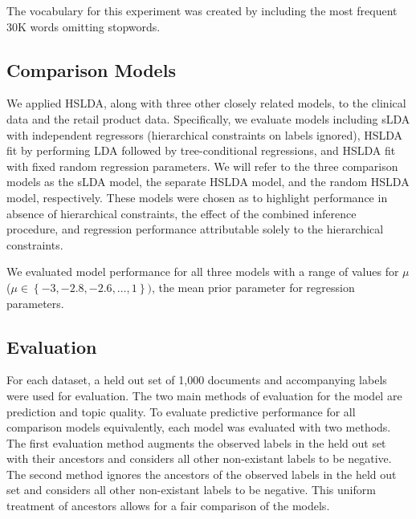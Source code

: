\documentclass{article}
\begin{document}
The vocabulary for this experiment was created by including the most
frequent 30K words omitting stopwords.


\subsection{Comparison Models}

We applied HSLDA, along with three other closely related models, to
the clinical data and the retail product data. Specifically, we evaluate
models including sLDA with independent regressors (hierarchical constraints
on labels ignored), HSLDA fit by performing LDA followed by tree-conditional
regressions, and HSLDA fit with fixed random regression parameters.
We will refer to the three comparison models as the sLDA model, the
separate HSLDA model, and the random HSLDA model, respectively. These
models were chosen as to highlight performance in absence of hierarchical
constraints, the effect of the combined inference procedure, and regression
performance attributable solely to the hierarchical constraints.

We evaluated model performance for all three models with a range of
values for $\mu$ ($\mu\in\left\{ -3,-2.8,-2.6,\ldots,1\right\} )$,
the mean prior parameter for regression parameters.


\subsection{Evaluation}

For each dataset, a held out set of 1,000 documents and accompanying
labels were used for evaluation. The two main methods of evaluation
for the model are prediction and topic quality. To evaluate predictive
performance for all comparison models equivalently, each model was
evaluated with two methods. The first evaluation method augments the
observed labels in the held out set with their ancestors and considers
all other non-existant labels to be negative. The second method ignores
the ancestors of the observed labels in the held out set and considers
all other non-existant labels to be negative. This uniform treatment
of ancestors allows for a fair comparison of the models.
\end{document}
